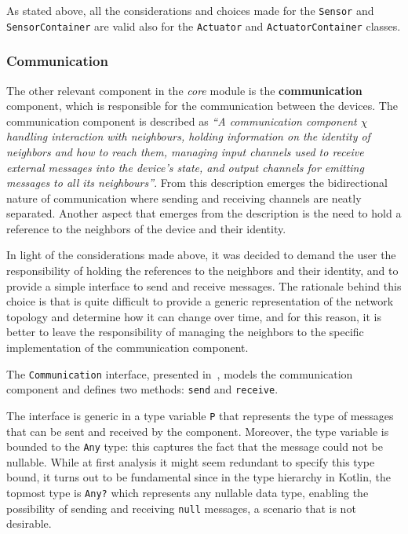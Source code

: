 As stated above, all the considerations and choices made for the \texttt{Sensor} and \texttt{SensorContainer} are valid also for the \texttt{Actuator}
and \texttt{ActuatorContainer} classes.

\subsubsection{Communication}

The other relevant component in the \emph{core} module is the \textbf{communication} component, which is responsible for the communication between
the devices.
The communication component is described as \textit{``A communication component $\chi$ handling interaction with neighbours, holding information on
	the identity of neighbors and how to reach them, managing input channels used to receive external messages into the device’s state, and output
	channels for emitting messages to all its neighbours''}.
From this description emerges the bidirectional nature of communication where sending and receiving channels are neatly separated.
Another aspect that emerges from the description is the need to hold a reference to the neighbors of the device and their identity.



In light of the considerations made above, it was decided to demand the user the responsibility of holding the references to the neighbors and
their identity, and to provide a simple interface to send and receive messages. The rationale behind this choice is that is quite difficult to
provide a generic representation of the network topology and determine how it can change over time, and for this reason, it is better to leave the
responsibility of managing the neighbors to the specific implementation of the communication component.

The \texttt{Communication} interface, presented in~, models the communication component and defines
two methods: \texttt{send} and \texttt{receive}.

The interface is generic in a type variable \texttt{P} that represents the type of messages that can be sent and received by the component.
Moreover, the type variable is bounded to the \texttt{Any} type: this captures the fact that the message could not be nullable.
While at first analysis it might seem redundant to specify this type bound, it turns out to be fundamental since in the type hierarchy in Kotlin, the
topmost type is \texttt{Any?} which represents any nullable data type, enabling the possibility of sending and receiving \texttt{null} messages,
a scenario that is not desirable.

